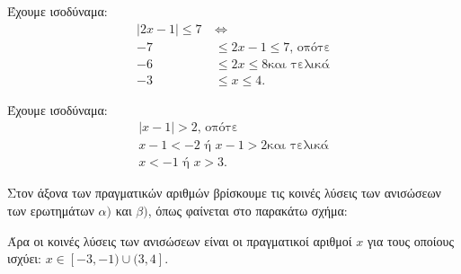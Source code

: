 
\begin{alist}
\item Έχουμε ισοδύναμα:
\begin{align*}
|2x - 1| \le 7 \ &\Leftrightarrow \\
-7 &\le 2x - 1 \le 7\text{, οπότε} \\
-6 &\le 2x \le 8\text{και τελικά} \\
-3 &\le x \le 4.
\end{align*}

\item Έχουμε ισοδύναμα:
\begin{gather*}
|x - 1| > 2\text{, οπότε} \\
x - 1 < -2 \text{ ή } x - 1 > 2\text{και τελικά} \\
x < -1 \text{ ή } x > 3.
\end{gather*}

\item Στον άξονα των πραγματικών αριθμών βρίσκουμε τις κοινές λύσεις των ανισώσεων των ερωτημάτων $\alpha)$ και $\beta)$, όπως φαίνεται στο παρακάτω σχήμα:

Άρα οι κοινές λύσεις των ανισώσεων είναι οι πραγματικοί αριθμοί $x$ για τους οποίους ισχύει: $x \in [-3, -1) \cup (3, 4]$.
\end{alist}

